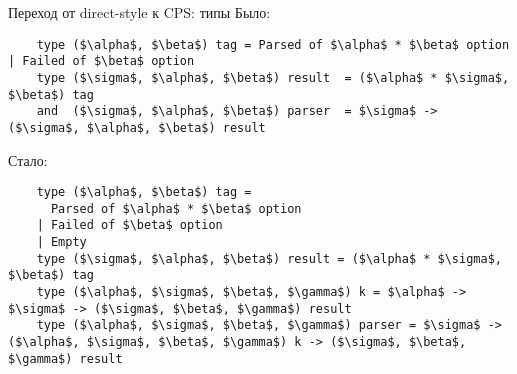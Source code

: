 \documentclass[10pt, mathserif]{beamer}
\theoremstyle{definition}
\begin{document}
\begin{frame}[fragile]{Переход от direct-style к CPS: типы}
  Было:
  \begin{lstlisting}
    type ($\alpha$, $\beta$) tag = Parsed of $\alpha$ * $\beta$ option | Failed of $\beta$ option
    type ($\sigma$, $\alpha$, $\beta$) result  = ($\alpha$ * $\sigma$, $\beta$) tag
    and  ($\sigma$, $\alpha$, $\beta$) parser  = $\sigma$ -> ($\sigma$, $\alpha$, $\beta$) result
  \end{lstlisting}

  Стало:
  \begin{lstlisting}
    type ($\alpha$, $\beta$) tag =
      Parsed of $\alpha$ * $\beta$ option
    | Failed of $\beta$ option
    | Empty
    type ($\sigma$, $\alpha$, $\beta$) result = ($\alpha$ * $\sigma$, $\beta$) tag
    type ($\alpha$, $\sigma$, $\beta$, $\gamma$) k = $\alpha$ -> $\sigma$ -> ($\sigma$, $\beta$, $\gamma$) result
    type ($\alpha$, $\sigma$, $\beta$, $\gamma$) parser = $\sigma$ -> ($\alpha$, $\sigma$, $\beta$, $\gamma$) k -> ($\sigma$, $\beta$, $\gamma$) result
  \end{lstlisting}

\end{frame}
%
%
%
%
%
%
\end{document}
